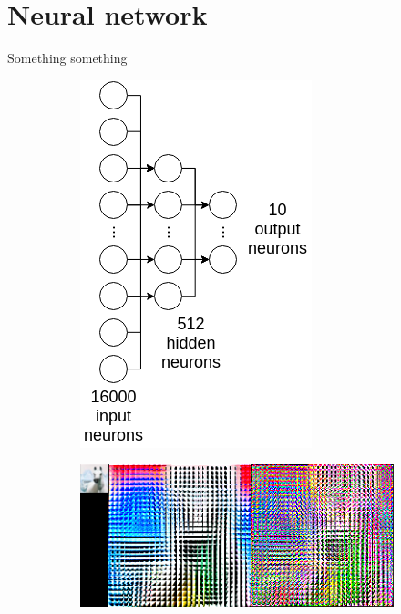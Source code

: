 \documentclass{article} %
\begin{document}
\section{Neural network}
\label{sub:neural}
    Something something
    \begin{figure}
        \centering
        \begin{subfigure}{.3\linewidth}
            \centering
            \includegraphics[width=.5\linewidth]{images/neural-architecture.png}
            \caption{}
        \end{subfigure}
        \begin{subfigure}{.4\linewidth}
            \centering
            \includegraphics[width=.75\linewidth]{images/normalize-zca.png}
        \caption{}
        \end{subfigure}
        \begin{subfigure}{.1\linewidth}
            \centering

\end{subfigure}
\end{figure}
\end{document}
